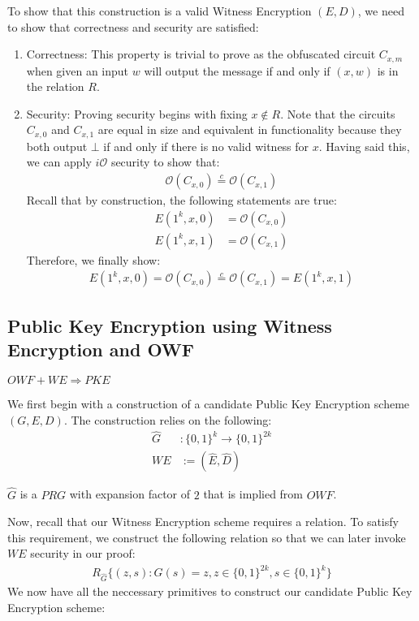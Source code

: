 \documentclass{article}
\newcommand{\ci}{\stackrel{c}{=}}
\newcommand{\io}{i\mathcal{O}}
\begin{document}
To show that this construction is a valid Witness Encryption $(E, D)$, we need to show that correctness and security are satisfied:
\begin{enumerate}
    \item Correctness: This property is trivial to prove as the obfuscated circuit $C_{x, m}$ when given an input $w$ will output the message if and only if $(x, w)$ is in the relation $R$.

    \item Security: Proving security begins with fixing $x \not \in R$. Note that the circuits $C_{x, 0}$ and $C_{x, 1}$ are equal in size and equivalent in functionality because they both output $\bot$ if and only if there is no valid witness for $x$. Having said this, we can apply $\io$ security to show that:
        \begin{align*}
            \mathcal{O}(C_{x, 0}) \ci \mathcal{O}(C_{x, 1})
        \end{align*}
    Recall that by construction, the following statements are true:
        \begin{align*}
            E(1^k, x, 0) &= \mathcal{O}(C_{x, 0}) \\
            E(1^k, x, 1) &= \mathcal{O}(C_{x, 1})
        \end{align*}
    Therefore, we finally show:
        \begin{align*}
            E(1^k, x, 0) = \mathcal{O}(C_{x, 0}) \ci \mathcal{O}(C_{x, 1}) = E(1^k, x, 1)
        \end{align*}
\end{enumerate}

\subsection{Public Key Encryption using Witness Encryption and OWF}

$OWF + WE \Rightarrow PKE$

\noindent
We first begin with a construction of a candidate Public Key Encryption scheme $(G, E, D)$. The construction relies on the following:
    \begin{align*}
        \hat{G}&: \{0,1\}^k \rightarrow \{0,1\}^{2k} \\
        WE &:= (\hat{E}, \hat{D})
    \end{align*}

$\hat{G}$ is a $PRG$ with expansion factor of $2$ that is implied from $OWF$.

\noindent Now, recall that our Witness Encryption scheme requires a relation. To satisfy this requirement, we construct the following relation so that we can later invoke $WE$ security in our proof:
\begin{align*}
    R_{\hat{G}}\{(z, s) : \hat{G}(s) = z, z \in \{0,1\}^{2k}, s \in \{0,1\}^k \}
\end{align*}
We now have all the neccessary primitives to construct our candidate Public Key Encryption scheme:
\end{document}
